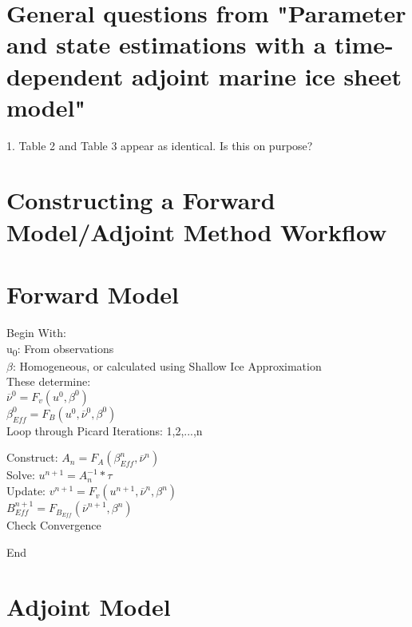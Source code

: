 \documentclass{report}
\begin{document}
\section*{General questions from "Parameter and state estimations with a time-dependent adjoint marine ice sheet model"}
1. Table 2 and Table 3 appear as identical. Is this on purpose?\\


\section*{Constructing a Forward Model/Adjoint Method Workflow}



\section*{Forward Model}
Begin With: \\
\hspace*{6ex}u\textsubscript{0}:			From observations \\
\hspace*{6ex}$\beta$:	Homogeneous, or calculated using Shallow Ice Approximation \\

These determine:\\
\hspace*{6ex}$\overline{\nu}^{0} = F_{v}(u^{0},\beta^{0})$	\\	
\hspace*{6ex}$\beta_{Eff}^{0} = F_{B}(u^{0},\overline{\nu}^{0},\beta^{0})$\\


Loop through Picard Iterations: 1,2,...,n 
\begin{adjustwidth}{2.5em}{0pt}
Construct: \quad $A_{n} = F_{A}(\beta_{Eff}^n,\overline{\nu}^{n})$\\
Solve: \quad\quad\quad $u^{n+1} = A_{n}^{-1} * \tau$\\
Update: \quad\quad $v^{n+1} = F_{v}(u^{n+1},\overline{\nu}^{n},\beta^{n})$\\
\hspace*{13ex}  $B_{Eff}^{n+1} = F_{B_{Eff}}(\overline{\nu}^{n+1},\beta^{n})$\\
Check Convergence
\end{adjustwidth}
End
\section*{Adjoint Model}
\end{document}
